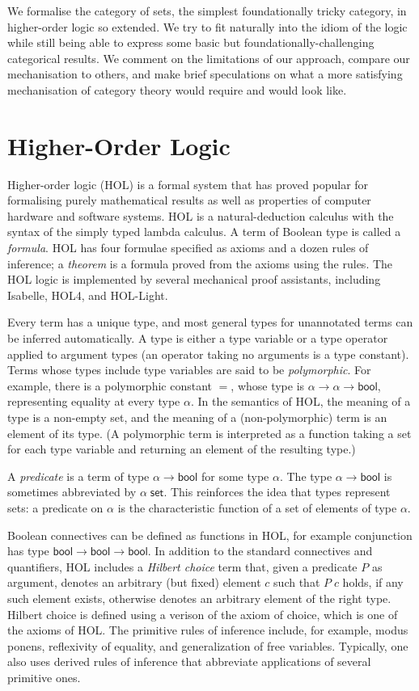\documentclass[twoside,titlepage,11pt]{article}
\begin{document}
We formalise the category of sets, the simplest foundationally tricky category, in higher-order logic so extended.
We try to fit naturally into the idiom of the logic while still being able to express some basic but foundationally-challenging categorical results.
We comment on the limitations of our approach, compare our mechanisation to others, and make brief speculations on what a more satisfying mechanisation of category theory would require and would look like.
\section{Higher-Order Logic}%
\newcommand{\bool}{\ensuremath{\mathsf{bool}}}
Higher-order logic (HOL) is a formal system that has proved popular for formalising purely mathematical results as well as properties of computer hardware and software systems.
HOL is a natural-deduction calculus with the syntax of the simply typed lambda calculus.
A term of Boolean type is called a \emph{formula}.
HOL has four formulae specified as axioms and a dozen rules of inference; a \emph{theorem} is a formula proved from the axioms using the rules.
The HOL logic is implemented by several mechanical proof assistants, including Isabelle, HOL4, and HOL-Light.

Every term has a unique type, and most general types for unannotated terms can be inferred automatically.
A type is either a type variable or a type operator applied to argument types (an operator taking no arguments is a type constant).
Terms whose types include type variables are said to be \emph{polymorphic}.
For example, there is a polymorphic constant $=$, whose type is $\alpha\to\alpha\to\bool$, representing equality at every type $\alpha$.
In the semantics of HOL, the meaning of a type is a non-empty set, and the meaning of a (non-polymorphic) term is an element of its type.
(A polymorphic term is interpreted as a function taking a set for each type variable and returning an element of the resulting type.)

A \emph{predicate} is a term of type $\alpha\to\bool$ for some type $\alpha$.
The type $\alpha\to\bool$ is sometimes abbreviated by $\alpha\;\mathsf{set}$.
This reinforces the idea that types represent sets: a predicate on $\alpha$ is the characteristic function of a set of elements of type $\alpha$.

Boolean connectives can be defined as functions in HOL, for example conjunction has type $\bool\to\bool\to\bool$.
In addition to the standard connectives and quantifiers, HOL includes a \emph{Hilbert choice} term that, given a predicate $P$ as argument, denotes an arbitrary (but fixed) element $c$ such that $P\; c$ holds, if any such element exists, otherwise denotes an arbitrary element of the right type.
Hilbert choice is defined using a verison of the axiom of choice, which is one of the axioms of HOL.
The primitive rules of inference include, for example, modus ponens, reflexivity of equality, and generalization of free variables.
Typically, one also uses derived rules of inference that abbreviate applications of several primitive ones.
\end{document}
